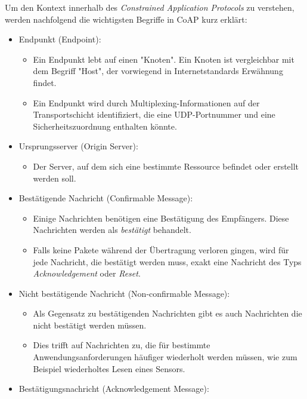 Um den Kontext innerhalb des \textit{Constrained Application Protocols} zu verstehen, werden nachfolgend die wichtigsten Begriffe in CoAP kurz erklärt:
\begin{itemize}
    \item Endpunkt (Endpoint):
          \begin{itemize}
              \item Ein Endpunkt lebt auf einen "Knoten". Ein Knoten ist vergleichbar mit dem Begriff "Host", der vorwiegend in Internetstandards Erwähnung findet.
              \item Ein Endpunkt wird durch Multiplexing-Informationen auf der Transportschicht identifiziert, die eine UDP-Portnummer und eine Sicherheitszuordnung enthalten könnte.
          \end{itemize}
    \item Ursprungsserver (Origin Server):
          \begin{itemize}
              \item Der Server, auf dem sich eine bestimmte Ressource befindet oder erstellt werden soll.
          \end{itemize}
    \item Bestätigende Nachricht (Confirmable Message):
          \begin{itemize}
              \item Einige Nachrichten benötigen eine Bestätigung des Empfängers. Diese Nachrichten werden als \textit{bestätigt} behandelt.
              \item Falls keine Pakete während der Übertragung verloren gingen, wird für jede Nachricht, die bestätigt werden muss, exakt eine Nachricht des Typs \textit{Acknowledgement} oder \textit{Reset}.
          \end{itemize}
    \item Nicht bestätigende Nachricht (Non-confirmable Message):
          \begin{itemize}
              \item Als Gegensatz zu bestätigenden Nachrichten gibt es auch Nachrichten die nicht bestätigt werden müssen.
              \item Dies trifft auf Nachrichten zu, die für bestimmte Anwendungsanforderungen häufiger wiederholt werden müssen, wie zum Beispiel wiederholtes Lesen eines Sensors.
          \end{itemize}
    \item Bestätigungsnachricht (Acknowledgement Message):
          \begin{itemize}

\end{itemize}
\end{itemize}
